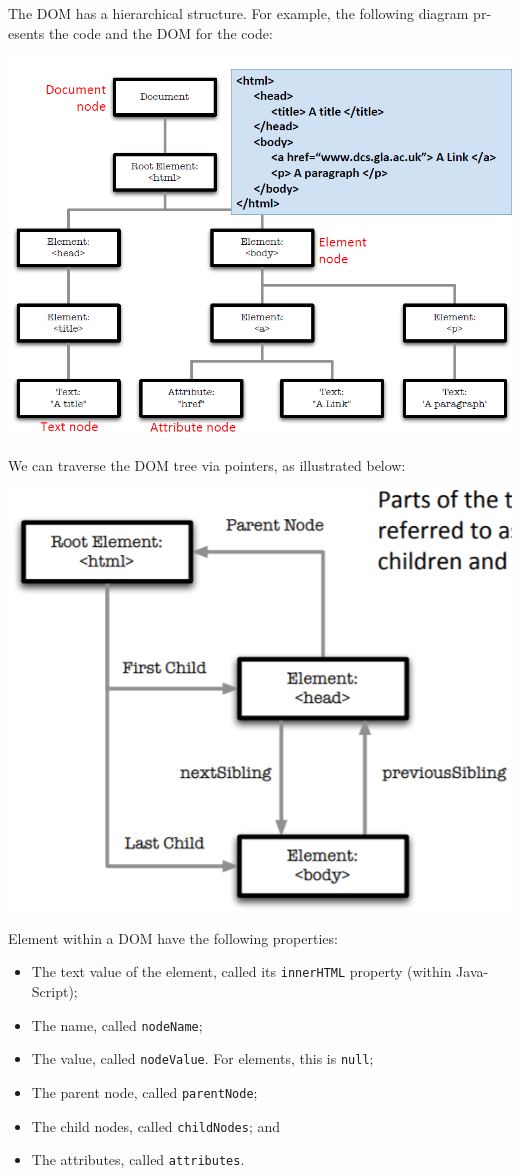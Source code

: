 \documentclass[a4paper, openany]{memoir}
\begin{document}
The DOM has a hierarchical structure. For example, the following diagram pr-esents the code and the DOM for the code:
\begin{center}
    \includegraphics[scale=0.5]{src/L12I4.PNG}
\end{center}
We can traverse the DOM tree via pointers, as illustrated below:
\begin{center}
    \includegraphics[scale=0.5]{src/L12I2.PNG}
\end{center}
Element within a DOM have the following properties:
\begin{itemize}
    \item The text value of the element, called its \texttt{innerHTML} property (within Java-Script);
    \item The name, called \texttt{nodeName};
    \item The value, called \texttt{nodeValue}. For elements, this is \texttt{null};
    \item The parent node, called \texttt{parentNode};
    \item The child nodes, called \texttt{childNodes}; and
    \item The attributes, called \texttt{attributes}.
\end{itemize}
\end{document}
